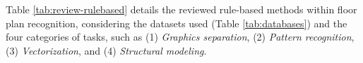 Table \ref{tab:review-rulebased} details the reviewed rule-based methods within floor plan recognition, considering the datasets used (Table \ref{tab:databases}) and the four categories of tasks, such as (1) \textit{Graphics separation}, (2) \textit{Pattern recognition}, (3) \textit{Vectorization}, and (4) \textit{Structural modeling}.